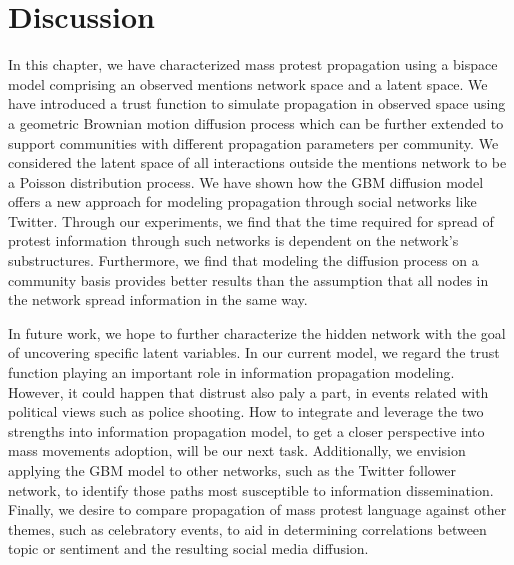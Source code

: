 
\section{Discussion}
In this chapter, we have characterized mass protest propagation using a
bispace model comprising an observed mentions network space and a latent space. We have introduced a trust function to simulate propagation in observed space using a geometric Brownian motion diffusion process which can be further extended to support communities with different propagation parameters per community. We
considered the latent space of all interactions outside the mentions network to be a Poisson distribution process. We have shown how the GBM diffusion model offers a new approach for modeling propagation through social networks like Twitter. Through our experiments, we find that the time required for spread of protest information through such networks is dependent on the network's substructures. Furthermore, we find that modeling the diffusion process on a community basis provides better results than the assumption that all nodes in the network spread information in the same way.

In future work, we hope to further characterize the hidden network with the goal of uncovering specific latent variables. In our current model, we regard the trust function playing an important role in information propagation modeling. However, it could happen that distrust also paly a part, in events related with political views such as police shooting. How to integrate and leverage the two strengths into information propagation model, to get a closer perspective into mass movements adoption, will be our next task. Additionally, we envision applying the GBM model to other networks, such as the Twitter follower network, to identify those paths most susceptible to information dissemination. Finally, we desire to compare propagation of mass protest language against other themes, such as celebratory events, to aid in determining correlations between topic or sentiment and the resulting social media diffusion.


